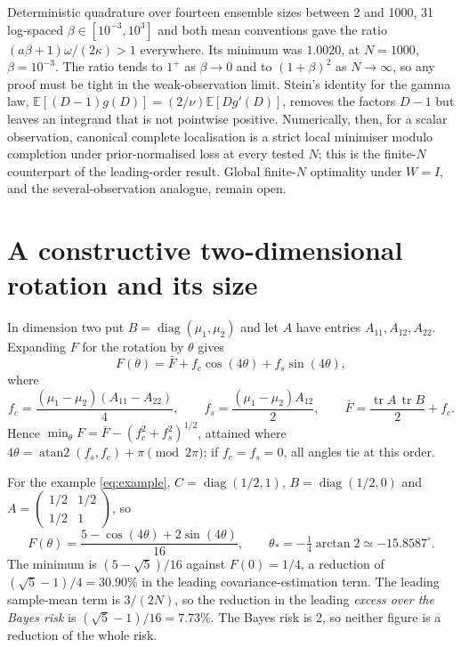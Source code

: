 \documentclass[11pt,a4paper]{article}
\numberwithin{equation}{section}
\theoremstyle{remark}\newtheorem{remark}[theorem]{Remark}
\newcommand{\E}{\mathbb E}
\newcommand{\tr}{\operatorname{tr}}
\newcommand{\diag}{\operatorname{diag}}
\begin{document}
Deterministic quadrature over fourteen ensemble sizes between 2 and 1000, 31 log-spaced
\(\beta\in[10^{-3},10^3]\) and both mean conventions gave the ratio
\((a\beta+1)\omega/(2\kappa)>1\) everywhere. Its minimum was \(1.0020\), at \(N=1000\),
\(\beta=10^{-3}\). The ratio tends to \(1^+\) as \(\beta\to0\) and to \((1+\beta)^2\) as \(N\to\infty\),
so any proof must be tight in the weak-observation limit. Stein's identity for the gamma law,
\(\E[(D-1)g(D)]=(2/\nu)\E[Dg'(D)]\), removes the factors \(D-1\) but leaves an integrand that is
not pointwise positive. Numerically, then, for a scalar observation, canonical complete localisation
is a strict local minimiser modulo completion under prior-normalised loss at every tested \(N\); this is the finite-\(N\) counterpart
of the leading-order result. Global finite-\(N\) optimality under \(W=I\), and the
several-observation analogue, remain open.

\section{A constructive two-dimensional rotation and its size}\label{sec:closedform}

In dimension two put \(B=\diag(\mu_1,\mu_2)\) and let \(A\) have entries
\(A_{11},A_{12},A_{22}\). Expanding \(F\) for the rotation by \(\theta\) gives
\[
 F(\theta)=\bar F+f_c\cos(4\theta)+f_s\sin(4\theta),
\]
where
\[
 f_c=\frac{(\mu_1-\mu_2)(A_{11}-A_{22})}4,\qquad
 f_s=\frac{(\mu_1-\mu_2)A_{12}}2,\qquad
 \bar F=\frac{\tr A\,\tr B}{2}+f_c .
\]
Hence \(\min_\theta F=\bar F-(f_c^2+f_s^2)^{1/2}\), attained where
\(4\theta=\operatorname{atan2}(f_s,f_c)+\pi\pmod{2\pi}\); if \(f_c=f_s=0\), all angles tie at this
order.

For the example \eqref{eq:example}, \(C=\diag(1/2,1)\), \(B=\diag(1/2,0)\) and
\(A=\left(\begin{smallmatrix}1/2&1/2\\1/2&1\end{smallmatrix}\right)\), so
\[
 F(\theta)=\frac{5-\cos(4\theta)+2\sin(4\theta)}{16},\qquad
 \theta_*=-\tfrac14\arctan2\simeq-15.8587^\circ .
\]
The minimum is \((5-\sqrt5)/16\) against \(F(0)=1/4\), a reduction of \((\sqrt5-1)/4=30.90\%\) in the
leading covariance-estimation term. The leading sample-mean term is \(3/(2N)\), so the reduction
in the leading \emph{excess over the Bayes risk} is \((\sqrt5-1)/16=7.73\%\). The Bayes risk is
2, so neither figure is a reduction of the whole risk.
\end{document}
